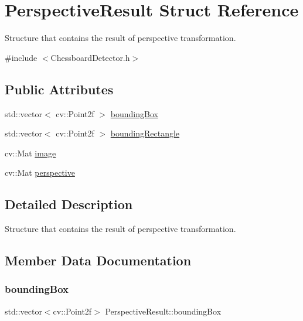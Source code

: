 \hypertarget{structPerspectiveResult}{}\section{Perspective\+Result Struct Reference}
\label{structPerspectiveResult}


Structure that contains the result of perspective transformation.  




{\ttfamily \#include $<$Chessboard\+Detector.\+h$>$}

\subsection*{Public Attributes}
\begin{DoxyCompactItemize}
\item 
std\+::vector$<$ cv\+::\+Point2f $>$ \hyperlink{structPerspectiveResult_a2780569aa3456b68798cad4697af8647}{bounding\+Box}
\item 
std\+::vector$<$ cv\+::\+Point2f $>$ \hyperlink{structPerspectiveResult_a78e1db1b132a9e364ab5f2c3b452b611}{bounding\+Rectangle}
\item 
cv\+::\+Mat \hyperlink{structPerspectiveResult_a0d73af1103688870135ebb3ff7bcdbdc}{image}
\item 
cv\+::\+Mat \hyperlink{structPerspectiveResult_af3e15ad54fa2f84ad2d782a2f0fd6e73}{perspective}
\end{DoxyCompactItemize}


\subsection{Detailed Description}
Structure that contains the result of perspective transformation. 

\subsection{Member Data Documentation}
\mbox{\label{structPerspectiveResult_a2780569aa3456b68798cad4697af8647}} 
\subsubsection{\texorpdfstring{bounding\+Box}{boundingBox}}
{\footnotesize\ttfamily std\+::vector$<$cv\+::\+Point2f$>$ Perspective\+Result\+::bounding\+Box}

